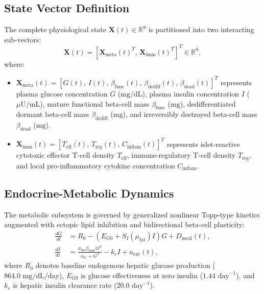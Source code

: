 \documentclass[11pt,a4paper]{article}
\begin{document}
\subsection{State Vector Definition}

The complete physiological state $\bm{X}(t) \in \mathbb{R}^8$ is partitioned into two interacting sub-vectors:
\begin{equation}
\bm{X}(t) = \left[ \bm{X}_{\mathrm{meta}}(t)^T, \, \bm{X}_{\mathrm{imm}}(t)^T \right]^T \in \mathbb{R}^8,
\end{equation}
where:
\begin{itemize}
    \item $\bm{X}_{\mathrm{meta}}(t) = [G(t), \, I(t), \, \beta_{\mathrm{func}}(t), \, \beta_{\mathrm{dediff}}(t), \, \beta_{\mathrm{dead}}(t)]^T$ represents plasma glucose concentration $G$ ($\text{mg/dL}$), plasma insulin concentration $I$ ($\mu\text{U/mL}$), mature functional beta-cell mass $\beta_{\mathrm{func}}$ ($\text{mg}$), dedifferentiated dormant beta-cell mass $\beta_{\mathrm{dediff}}$ ($\text{mg}$), and irreversibly destroyed beta-cell mass $\beta_{\mathrm{dead}}$ ($\text{mg}$).
    \item $\bm{X}_{\mathrm{imm}}(t) = [T_{\mathrm{eff}}(t), \, T_{\mathrm{reg}}(t), \, C_{\mathrm{inflam}}(t)]^T$ represents islet-reactive cytotoxic effector T-cell density $T_{\mathrm{eff}}$, immune-regulatory T-cell density $T_{\mathrm{reg}}$, and local pro-inflammatory cytokine concentration $C_{\mathrm{inflam}}$.
\end{itemize}

\subsection{Endocrine-Metabolic Dynamics}

The metabolic subsystem is governed by generalized nonlinear Topp-type kinetics \cite{Topp2000} augmented with ectopic lipid inhibition and bidirectional beta-cell plasticity:
\begin{align}
\frac{dG}{dt} &= R_0 - \left( E_{G0} + S_I(\mu_{\mathrm{fat}}) I \right) G + D_{\mathrm{meal}}(t), \label{eq:dG} \\
\frac{dI}{dt} &= \frac{\sigma_{\mathrm{ins}} \beta_{\mathrm{func}} G^2}{\alpha_G + G^2} - k_e I + u_{\mathrm{ext}}(t), \label{eq:dI}
\end{align}
where $R_0$ denotes baseline endogenous hepatic glucose production ($864.0\text{ mg/dL/day}$), $E_{G0}$ is glucose effectiveness at zero insulin ($1.44\text{ day}^{-1}$), and $k_e$ is hepatic insulin clearance rate ($20.0\text{ day}^{-1}$).
\end{document}
